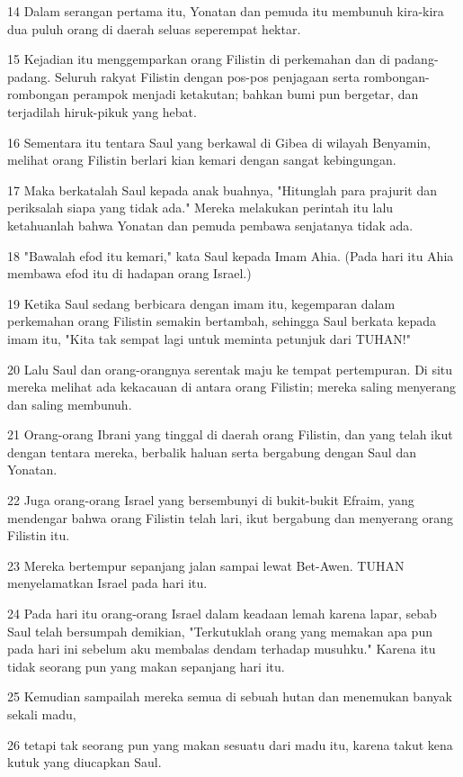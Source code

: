 \par 14 Dalam serangan pertama itu, Yonatan dan pemuda itu membunuh kira-kira dua puluh orang di daerah seluas seperempat hektar.
\par 15 Kejadian itu menggemparkan orang Filistin di perkemahan dan di padang-padang. Seluruh rakyat Filistin dengan pos-pos penjagaan serta rombongan-rombongan perampok menjadi ketakutan; bahkan bumi pun bergetar, dan terjadilah hiruk-pikuk yang hebat.
\par 16 Sementara itu tentara Saul yang berkawal di Gibea di wilayah Benyamin, melihat orang Filistin berlari kian kemari dengan sangat kebingungan.
\par 17 Maka berkatalah Saul kepada anak buahnya, "Hitunglah para prajurit dan periksalah siapa yang tidak ada." Mereka melakukan perintah itu lalu ketahuanlah bahwa Yonatan dan pemuda pembawa senjatanya tidak ada.
\par 18 "Bawalah efod itu kemari," kata Saul kepada Imam Ahia. (Pada hari itu Ahia membawa efod itu di hadapan orang Israel.)
\par 19 Ketika Saul sedang berbicara dengan imam itu, kegemparan dalam perkemahan orang Filistin semakin bertambah, sehingga Saul berkata kepada imam itu, "Kita tak sempat lagi untuk meminta petunjuk dari TUHAN!"
\par 20 Lalu Saul dan orang-orangnya serentak maju ke tempat pertempuran. Di situ mereka melihat ada kekacauan di antara orang Filistin; mereka saling menyerang dan saling membunuh.
\par 21 Orang-orang Ibrani yang tinggal di daerah orang Filistin, dan yang telah ikut dengan tentara mereka, berbalik haluan serta bergabung dengan Saul dan Yonatan.
\par 22 Juga orang-orang Israel yang bersembunyi di bukit-bukit Efraim, yang mendengar bahwa orang Filistin telah lari, ikut bergabung dan menyerang orang Filistin itu.
\par 23 Mereka bertempur sepanjang jalan sampai lewat Bet-Awen. TUHAN menyelamatkan Israel pada hari itu.
\par 24 Pada hari itu orang-orang Israel dalam keadaan lemah karena lapar, sebab Saul telah bersumpah demikian, "Terkutuklah orang yang memakan apa pun pada hari ini sebelum aku membalas dendam terhadap musuhku." Karena itu tidak seorang pun yang makan sepanjang hari itu.
\par 25 Kemudian sampailah mereka semua di sebuah hutan dan menemukan banyak sekali madu,
\par 26 tetapi tak seorang pun yang makan sesuatu dari madu itu, karena takut kena kutuk yang diucapkan Saul.
